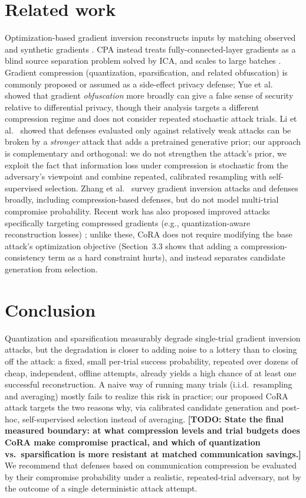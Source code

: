 \documentclass{article}
\newcommand{\todo}[1]{\textbf{[TODO: #1]}}
\begin{document}
\section{Related work}
Optimization-based gradient inversion reconstructs inputs by matching
observed and synthetic gradients \cite{zhu2019deep,geiping2020inverting}.
CPA instead treats fully-connected-layer gradients as a blind source
separation problem solved by ICA, and scales to large batches
\cite{kariyappa2023cocktail}. Gradient compression (quantization,
sparsification, and related obfuscation) is commonly proposed or assumed as
a side-effect privacy defense; Yue et al.~\cite{yue2023gradient} showed that
gradient \emph{obfuscation} more broadly can give a false sense of security
relative to differential privacy, though their analysis targets a different
compression regime and does not consider repeated stochastic attack trials.
Li et al.~\cite{li2022ggl} showed that defenses evaluated only against
relatively weak attacks can be broken by a \emph{stronger} attack that adds a
pretrained generative prior; our approach is complementary and orthogonal:
we do not strengthen the attack's prior, we exploit the fact that
information loss under compression is stochastic from the adversary's
viewpoint and combine repeated, calibrated resampling with self-supervised
selection. Zhang et al.~\cite{zhang2022survey} survey gradient inversion attacks and
defenses broadly, including compression-based defenses, but do not model
multi-trial compromise probability. Recent work has also proposed improved
attacks specifically targeting compressed gradients (e.g., quantization-aware
reconstruction losses) \cite{yu2024compressed}; unlike these, CoRA does not
require modifying the base attack's optimization objective (Section~3.3
shows that adding a compression-consistency term as a hard constraint
hurts), and instead separates candidate generation from selection.

\section{Conclusion}
Quantization and sparsification measurably degrade single-trial gradient
inversion attacks, but the degradation is closer to adding noise to a
lottery than to closing off the attack: a fixed, small per-trial success
probability, repeated over dozens of cheap, independent, offline attempts,
already yields a high chance of at least one successful reconstruction. A
naive way of running many trials (i.i.d.\ resampling and averaging) mostly
fails to realize this risk in practice; our proposed CoRA attack targets the
two reasons why, via calibrated candidate generation and post-hoc,
self-supervised selection instead of averaging.
\todo{State the final measured boundary: at what compression levels and
trial budgets does CoRA make compromise practical, and which of quantization
vs.\ sparsification is more resistant at matched communication savings.} We
recommend that defenses based on communication compression be evaluated by
their compromise probability under a realistic, repeated-trial adversary,
not by the outcome of a single deterministic attack attempt.



\end{document}
